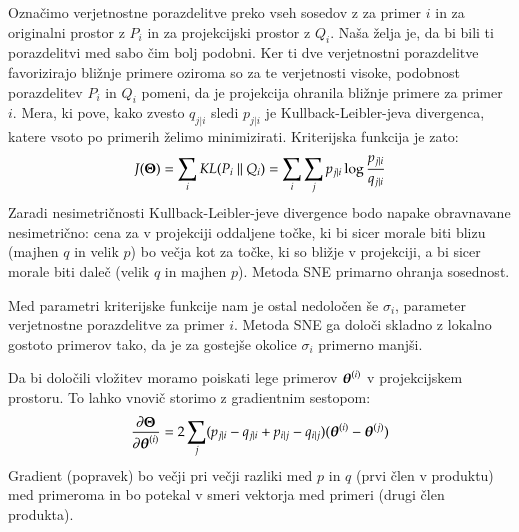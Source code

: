 Označimo verjetnostne porazdelitve preko vseh sosedov z za primer $i$ in za originalni prostor z $P_i$ in za projekcijski prostor z $Q_i$. Naša želja je, da bi bili ti porazdelitvi med sabo čim bolj podobni. Ker ti dve verjetnostni porazdelitve favorizirajo bližnje primere oziroma so za te verjetnosti visoke, podobnost porazdelitev $P_i$ in $Q_i$ pomeni, da je projekcija ohranila bližnje primere za primer $i$. Mera, ki pove, kako zvesto $q_{j|i}$ sledi $p_{j|i}$ je Kullback-Leibler-jeva divergenca, katere vsoto po primerih želimo minimizirati. Kriterijska funkcija je zato:
\begin{equation}
  J(\vect{\Theta}) = \sum_i KL(P_i\ ||\ Q_i)=\sum_i\sum_j p_{j|i}\log\frac{p_{j|i}}{q_{j|i}}
\end{equation}
Zaradi nesimetričnosti Kullback-Leibler-jeve divergence bodo napake obravnavane nesimetrično: cena za v projekciji oddaljene točke, ki bi sicer morale biti blizu (majhen $q$ in velik $p$) bo večja kot za točke, ki so bližje v projekciji, a bi sicer morale biti daleč (velik $q$ in majhen $p$). Metoda SNE primarno ohranja sosednost.

Med parametri kriterijske funkcije nam je ostal nedoločen še $\sigma_i$, parameter verjetnostne porazdelitve za primer $i$. Metoda SNE ga določi skladno z lokalno gostoto primerov tako, da je za gostejše okolice $\sigma_i$ primerno manjši.

Da bi določili vložitev moramo poiskati lege primerov $\boldsymbol{\theta}^{(i)}$ v projekcijskem prostoru. To lahko vnovič storimo z gradientnim sestopom:
%
\begin{equation}
\nonumber
\frac{\partial\boldsymbol{\Theta}}{\partial\boldsymbol{\theta}^{(i)}}=
  2\sum_j(p_{j|i}-q_{j|i}+p_{i|j}-q_{i|j})(\boldsymbol{\theta}^{(i)}-\boldsymbol{\theta}^{(j)})
\end{equation}
%
Gradient (popravek) bo večji pri večji razliki med $p$ in $q$ (prvi člen v produktu) med primeroma in bo potekal v smeri vektorja med primeri (drugi člen produkta).

